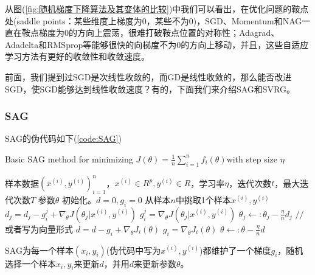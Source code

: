 % 
% 
        从图(\ref{fig:随机梯度下降算法及其变体的比较})中我们可以看出，在优化问题的鞍点处(saddle points：某些维度上梯度为0，某些不为0)，SGD、Momentum和NAG一直在鞍点梯度为0的方向上震荡，很难打破鞍点位置的对称性；Adagrad、Adadelta和RMSprop等能够很快的向梯度不为0的方向上移动，并且，这些自适应学习方法有更好的收敛性和收敛速度。
        \par
        前面，我们提到过SGD是次线性收敛的，而GD是线性收敛的，那么能否改进SGD，使SGD能够达到线性收敛速度？有的，下面我们来介绍SAG和SVRG。
        \subsubsection{SAG}
            \par
            SAG的伪代码如下(\ref{code:SAG})
            \begin{algorithm}[h]
                \caption{Basic SAG method for minimizing $J(\theta) = \frac 1n \sum_{i = 1}^nf_i(\theta)$with step size $\eta$}\label{code:SAG}
                \begin{algorithmic}[1]
                    \Require 样本数据$(x^{(i)},y^{(i)})_{i=1}^n$，$x^{(i)}\in R^p,y^{(i)}\in R$，学习率$\eta$，迭代次数$t$，最大迭代次数$T$
                    \Ensure 参数$\theta$
                    \State 初始化。$d= 0,g_i = 0$
                      \State 从样本$n$中挑取1个样本$x^{(i)},y^{(i)}$
                        \State $d_j = d_j - g_i^j + \nabla _\theta J(\theta_j|x^{(i)},y^{(i)})$
                        \State $g_i^j = \nabla _\theta J(\theta_j|x^{(i)},y^{(i)})$
                        \State $\theta_j \leftarrow:\theta_j - \frac{\eta}{n} d_j$
                      \EndFor
                      \State $//$ 或者写为向量形式
                      \State $d = d - g_i + \nabla _\theta J_i(\theta)$
                      \State $g_i = \nabla_\theta J_i(\theta)$
                      \State $\theta \leftarrow :\theta - \frac{\eta}{n}d$
                    \EndFor
                \end{algorithmic}
            \end{algorithm}
            \par
            SAG为每一个样本$(x_i,y_i)$(伪代码中写为$x^{(i)},y^{(i)}$)都维护了一个梯度$g_i$，随机选择一个样本$x_i,y_i$来更新$d$，并用$d$来更新参数$\theta$。
